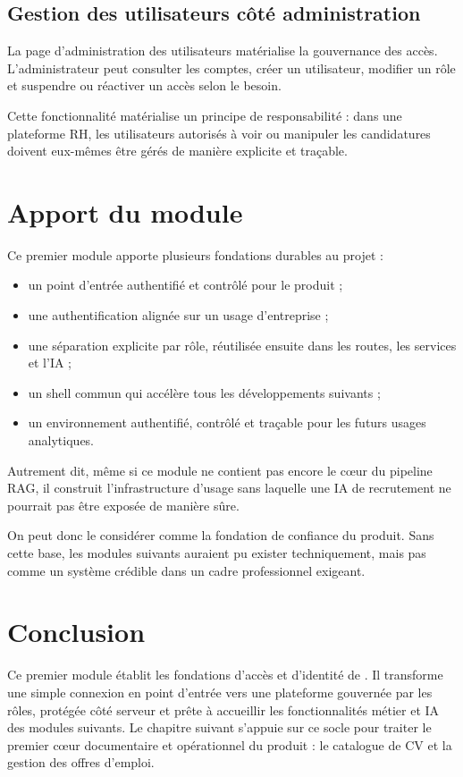 \subsection{Gestion des utilisateurs côté administration}
La page d'administration des utilisateurs matérialise la gouvernance des accès. L'administrateur peut consulter les comptes, créer un utilisateur, modifier un rôle et suspendre ou réactiver un accès selon le besoin.

Cette fonctionnalité matérialise un principe de responsabilité : dans une plateforme RH, les utilisateurs autorisés à voir ou manipuler les candidatures doivent eux-mêmes être gérés de manière explicite et traçable.

\section{Apport du module}
Ce premier module apporte plusieurs fondations durables au projet :
\begin{itemize}
  \item un point d'entrée authentifié et contrôlé pour le produit ;
  \item une authentification alignée sur un usage d'entreprise ;
  \item une séparation explicite par rôle, réutilisée ensuite dans les routes, les services et l'IA ;
  \item un shell commun qui accélère tous les développements suivants ;
  \item un environnement authentifié, contrôlé et traçable pour les futurs usages analytiques.
\end{itemize}

Autrement dit, même si ce module ne contient pas encore le c\oe{}ur du pipeline RAG, il construit l'infrastructure d'usage sans laquelle une IA de recrutement ne pourrait pas être exposée de manière sûre.

On peut donc le considérer comme la fondation de confiance du produit. Sans cette base, les modules suivants auraient pu exister techniquement, mais pas comme un système crédible dans un cadre professionnel exigeant.

\section*{Conclusion}
Ce premier module établit les fondations d'accès et d'identité de \projectname{}. Il transforme une simple connexion en point d'entrée vers une plateforme gouvernée par les rôles, protégée côté serveur et prête à accueillir les fonctionnalités métier et IA des modules suivants. Le chapitre suivant s'appuie sur ce socle pour traiter le premier c\oe{}ur documentaire et opérationnel du produit : le catalogue de CV et la gestion des offres d'emploi.
